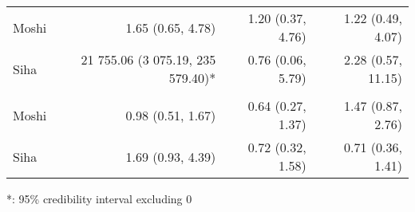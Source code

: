 \begin{table}[t]
\begin{tabular*}{\linewidth}{@{\extracolsep{\fill}}l|rrr}
\midrule\addlinespace[2.5pt]
Moshi & 1.65 (0.65, 4.78)  & 1.20 (0.37, 4.76)  & 1.22 (0.49, 4.07)  \\ 
Siha & 21 755.06 (3 075.19, 235 579.40)* & 0.76 (0.06, 5.79)  & 2.28 (0.57, 11.15)  \\ 
\midrule\addlinespace[2.5pt]
\multicolumn{4}{l}{Schistosomiasis} \\[2.5pt] 
\midrule\addlinespace[2.5pt]
Moshi & 0.98 (0.51, 1.67)  & 0.64 (0.27, 1.37)  & 1.47 (0.87, 2.76)  \\ 
Siha & 1.69 (0.93, 4.39)  & 0.72 (0.32, 1.58)  & 0.71 (0.36, 1.41)  \\ 
\bottomrule
\end{tabular*}
\begin{minipage}{\linewidth}
*: 95\% credibility interval excluding 0\\
\end{minipage}
\end{table}

